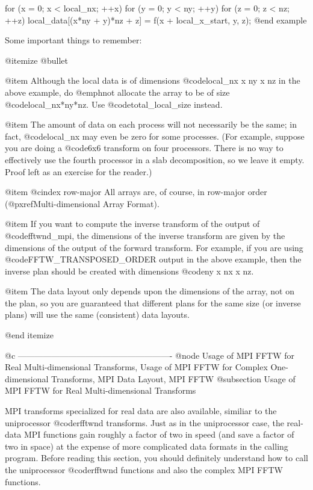         for (x = 0; x < local_nx; ++x)
                for (y = 0; y < ny; ++y)
                        for (z = 0; z < nz; ++z)
                                local_data[(x*ny + y)*nz + z]
                                        = f(x + local_x_start, y, z);
@end example

Some important things to remember:

@itemize @bullet

@item
Although the local data is of dimensions @code{local_nx x ny x nz} in
the above example, do @emph{not} allocate the array to be of size
@code{local_nx*ny*nz}.  Use @code{total_local_size} instead.

@item
The amount of data on each process will not necessarily be the same; in
fact, @code{local_nx} may even be zero for some processes.  (For
example, suppose you are doing a @code{6x6} transform on four
processors.  There is no way to effectively use the fourth processor in
a slab decomposition, so we leave it empty.  Proof left as an exercise
for the reader.)

@item
@cindex row-major
All arrays are, of course, in row-major order (@pxref{Multi-dimensional
Array Format}).

@item
If you want to compute the inverse transform of the output of
@code{fftwnd_mpi}, the dimensions of the inverse transform are given by
the dimensions of the output of the forward transform.  For example, if
you are using @code{FFTW_TRANSPOSED_ORDER} output in the above example,
then the inverse plan should be created with dimensions @code{ny x nx x
nz}.

@item
The data layout only depends upon the dimensions of the array, not on
the plan, so you are guaranteed that different plans for the same size
(or inverse plans) will use the same (consistent) data layouts.

@end itemize

@c -------------------------------------------------------
@node Usage of MPI FFTW for Real Multi-dimensional Transforms, Usage of MPI FFTW for Complex One-dimensional Transforms, MPI Data Layout, MPI FFTW
@subsection Usage of MPI FFTW for Real Multi-dimensional Transforms

MPI transforms specialized for real data are also available, similiar to
the uniprocessor @code{rfftwnd} transforms.  Just as in the uniprocessor
case, the real-data MPI functions gain roughly a factor of two in speed
(and save a factor of two in space) at the expense of more complicated
data formats in the calling program.  Before reading this section, you
should definitely understand how to call the uniprocessor @code{rfftwnd}
functions and also the complex MPI FFTW functions.

